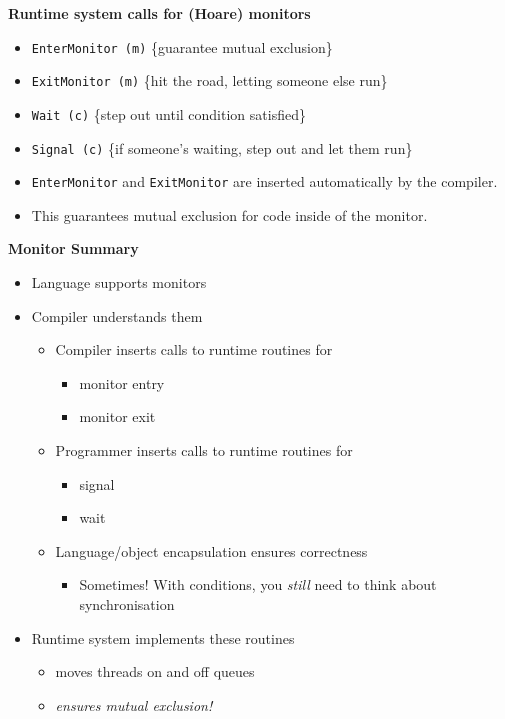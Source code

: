\documentclass[11pt,a4paper]{article}
\begin{document}
\textbf{Runtime system calls for (Hoare) monitors}
\begin{itemize}
    \item \texttt{EnterMonitor\,(m)} \{guarantee mutual exclusion\}
    \item \texttt{ExitMonitor\,(m)} \{hit the road, letting someone else run\}
    \item \texttt{Wait\,(c)} \{step out until condition satisfied\}
    \item \texttt{Signal\,(c)} \{if someone's waiting, step out and let them run\}
    \item \texttt{EnterMonitor} and \texttt{ExitMonitor} are inserted automatically by the
        compiler.
    \item This guarantees mutual exclusion for code inside of the monitor.
\end{itemize}

\textbf{Monitor Summary}
\begin{itemize}
    \item Language supports monitors
    \item Compiler understands them
        \begin{itemize}
            \item Compiler inserts calls to runtime routines for
                \begin{itemize}
                    \item monitor entry
                    \item monitor exit
                \end{itemize}
            \item Programmer inserts calls to runtime routines for
                \begin{itemize}
                    \item signal
                    \item wait
                \end{itemize}
            \item Language/object encapsulation ensures correctness
                \begin{itemize}
                    \item Sometimes!
                        With conditions, you \emph{still} need to think about synchronisation
                \end{itemize}
        \end{itemize}
    \item Runtime system implements these routines
        \begin{itemize}
            \item moves threads on and off queues
            \item \emph{ensures mutual exclusion!}
        \end{itemize}
\end{itemize}
\end{document}
